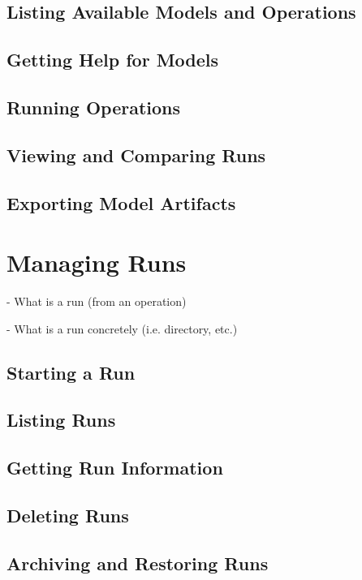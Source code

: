 \documentclass{article}
\begin{document}
\subsection{Listing Available Models and Operations}

\subsection{Getting Help for Models}

\subsection{Running Operations}

\subsection{Viewing and Comparing Runs}

\subsection{Exporting Model Artifacts}

\section{Managing Runs}

- What is a run (from an operation)

- What is a run concretely (i.e. directory, etc.)

\subsection{Starting a Run}

\subsection{Listing Runs}

\subsection{Getting Run Information}

\subsection{Deleting Runs}

\subsection{Archiving and Restoring Runs}
\end{document}
